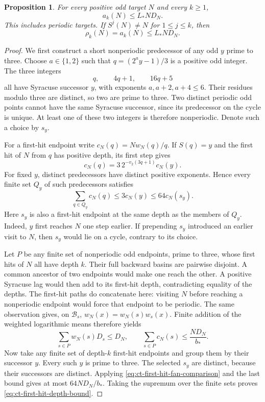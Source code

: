 \documentclass[11pt,a4paper]{article}
\newtheorem{proposition}[theorem]{Proposition}
\begin{document}
\begin{proposition}\label{prop:ct-first-hit-depth-bound}
For every positive odd target \(N\) and every \(k\ge1\),
\begin{equation}\label{eq:ct-first-hit-depth-bound}
 a_k(N)\le L_*ND_N.
\end{equation}
This includes periodic targets. If
\(S^j(N)\ne N\) for \(1\le j\le k\), then
\begin{equation}\label{eq:ct-finite-return-cylinder-bound}
 \rho_k(N)=a_k(N)\le L_*ND_N.
\end{equation}
\end{proposition}
\begin{proof}
We first construct a short nonperiodic predecessor of any odd
\(y\) prime to three. Choose \(a\in\{1,2\}\) such that
\(q=(2^ay-1)/3\) is a positive odd integer. The three integers
\[
 q,\qquad 4q+1,\qquad 16q+5
\]
all have Syracuse successor \(y\), with exponents
\(a,a+2,a+4\le6\). Their residues modulo three are distinct,
so two are prime to three. Two distinct periodic odd points cannot have the same Syracuse
successor, since its predecessor on the cycle is unique. At least one
of these two integers is therefore nonperiodic. Denote such a
choice by \(s_y\).

For a first-hit endpoint write \(c_N(q)=Nw_N(q)/q\).
If \(S(q)=y\) and the first hit of \(N\) from \(q\) has positive
depth, its first step gives
\[
 c_N(q)=3\,2^{-v_2(3q+1)}c_N(y).
\]
For fixed \(y\), distinct predecessors have distinct positive
exponents. Hence every finite set \(Q_y\) of such predecessors
satisfies
\begin{equation}\label{eq:ct-first-hit-fan-comparison}
 \sum_{q\in Q_y}c_N(q)\le3c_N(y)\le64c_N(s_y).
\end{equation}
Here \(s_y\) is also a first-hit endpoint at the same depth as
the members of \(Q_y\). Indeed, \(y\) first reaches \(N\) one
step earlier. If prepending \(s_y\) introduced an earlier visit
to \(N\), then \(s_y\) would lie on a cycle, contrary to its
choice.

Let \(P\) be any finite set of nonperiodic odd endpoints, prime
to three, whose first hits of \(N\) all have depth \(k\).
Their full backward basins are pairwise disjoint. A common
ancestor of two endpoints would make one reach the other.
A positive Syracuse lag would then add to its first-hit depth,
contradicting equality of the depths. The first-hit paths do
concatenate here: visiting \(N\) before reaching a nonperiodic
endpoint would force that endpoint to be periodic.
The same observation gives, on \(\mathcal B_s\),
\(w_N(x)=w_N(s)w_s(x)\). Finite addition of the weighted
logarithmic means therefore yields
\[
 \sum_{s\in P}w_N(s)D_s\le D_N,\qquad
 \sum_{s\in P}c_N(s)\le\frac{ND_N}{b_*}.
\]
Now take any finite set of depth-\(k\) first-hit endpoints and
group them by their successor \(y\). Every such \(y\) is prime
to three. The selected \(s_y\) are distinct, because their
successors are distinct. Applying
\eqref{eq:ct-first-hit-fan-comparison} and the last bound gives
at most \(64ND_N/b_*\). Taking the supremum over the finite
sets proves \eqref{eq:ct-first-hit-depth-bound}.


\end{proof}
\end{document}

